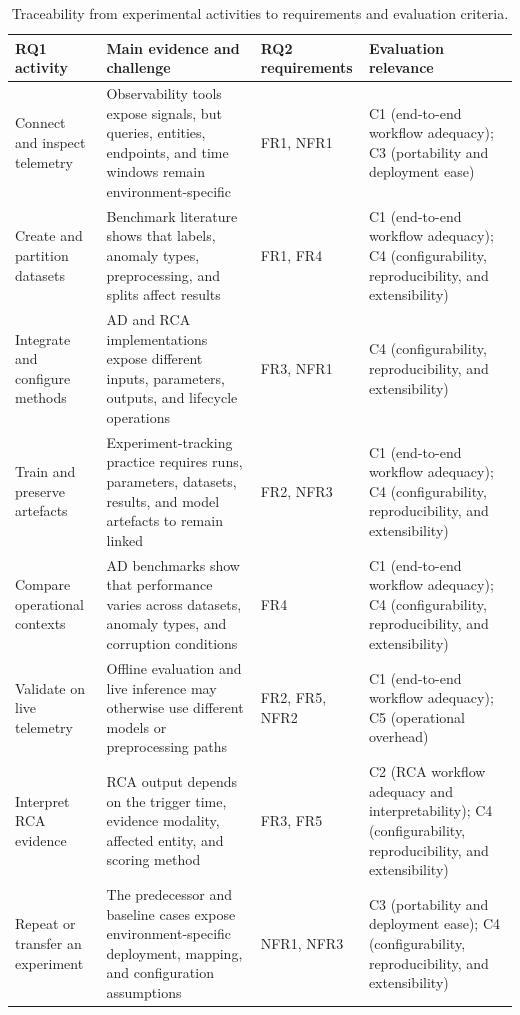 \begin{table}[H]
    \centering
    \small
    \caption{Traceability from experimental activities to requirements and evaluation criteria.}
    \label{tab:rq1-rq2-traceability}
    \begin{tabularx}{\textwidth}{p{2.7cm} X p{2.4cm} X}
        \toprule
        RQ1 activity & Main evidence and challenge & RQ2 requirements & Evaluation relevance \\
        \midrule
        Connect and inspect telemetry & Observability tools expose signals, but queries, entities, endpoints, and time windows remain environment-specific & FR1, NFR1 & C1 (end-to-end workflow adequacy); C3 (portability and deployment ease) \\
        Create and partition datasets & Benchmark literature shows that labels, anomaly types, preprocessing, and splits affect results & FR1, FR4 & C1 (end-to-end workflow adequacy); C4 (configurability, reproducibility, and extensibility) \\
        Integrate and configure methods & AD and RCA implementations expose different inputs, parameters, outputs, and lifecycle operations & FR3, NFR1 & C4 (configurability, reproducibility, and extensibility) \\
        Train and preserve artefacts & Experiment-tracking practice requires runs, parameters, datasets, results, and model artefacts to remain linked & FR2, NFR3 & C1 (end-to-end workflow adequacy); C4 (configurability, reproducibility, and extensibility) \\
        Compare operational contexts & AD benchmarks show that performance varies across datasets, anomaly types, and corruption conditions & FR4 & C1 (end-to-end workflow adequacy); C4 (configurability, reproducibility, and extensibility) \\
        Validate on live telemetry & Offline evaluation and live inference may otherwise use different models or preprocessing paths & FR2, FR5, NFR2 & C1 (end-to-end workflow adequacy); C5 (operational overhead) \\
        Interpret RCA evidence & RCA output depends on the trigger time, evidence modality, affected entity, and scoring method & FR3, FR5 & C2 (RCA workflow adequacy and interpretability); C4 (configurability, reproducibility, and extensibility) \\
        Repeat or transfer an experiment & The predecessor and baseline cases expose environment-specific deployment, mapping, and configuration assumptions & NFR1, NFR3 & C3 (portability and deployment ease); C4 (configurability, reproducibility, and extensibility) \\
        \bottomrule
    \end{tabularx}
\end{table}

